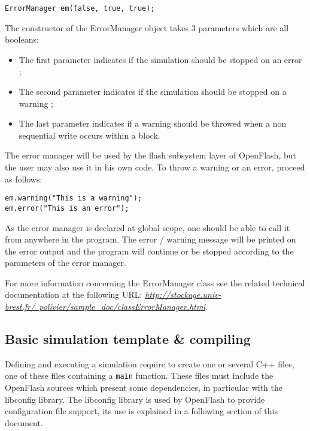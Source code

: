 \begin{lstlisting}
ErrorManager em(false, true, true);
\end{lstlisting}

The constructor of the ErrorManager object takes 3 parameters which are all booleans:

\begin{itemize}
  \item The first parameter indicates if the simulation should be stopped on an error ;
  \item The second parameter indicates if the simulation should be stopped on a warning ;
  \item The last parameter indicates if a warning should be throwed when a non sequential write occurs within a block.
\end{itemize}

The error manager will be used by the flash subsystem layer of OpenFlash, but the user may also use it in his own code. To throw a warning or an error, proceed as follows:

\begin{lstlisting}
em.warning("This is a warning");
em.error("This is an error");
\end{lstlisting}

As the error manager is declared at global scope, one should be able to call it from anywhere in the program. The error / warning message will be printed on the error output and the program will continue or be stopped according to the parameters of the error manager.

For more information concerning the ErrorManager class see the related technical documentation at the following URL:
\href{http://stockage.univ-brest.fr/~polivier/sample_doc/classErrorManager.html}{\textit{http://stockage.univ-brest.fr/~polivier/sample\_doc/classErrorManager.html}}.

\subsection{Basic simulation template \& compiling}

Defining and executing a simulation require to create one or several C++ files, one of these files containing a \verb+main+ function. These files must include the OpenFlash sources which present some dependencies, in particular with the libconfig library. The libconfig library is used by OpenFlash to provide configuration file support, its use is explained in a following section of this document.

